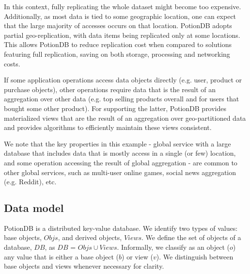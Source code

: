 \documentclass[sigconf, nonacm]{acmart}
\begin{document}
In this context, fully replicating the whole dataset might become too expensive.
Additionally, as most data is tied to some geographic location, one can expect that the large majority of accesses
occurs on that location. 
PotionDB adopts partial geo-replication, with data items being replicated only at some locations.
This allows PotionDB to reduce replication cost when
compared to solutions featuring full replication, saving on both storage, processing and networking costs.

If some application operations access data objects directly (e.g. user, product or purchase objects),
other operations require data that is the result of an aggregation over other data (e.g.  top
selling products overall and for users that bought some other product).  For supporting the latter, %
PotionDB provides materialized views that are the result of an aggregation 
over geo-partitioned data and provides algorithms to efficiently maintain these views consistent.

We note that the key properties in this example - global service with a large database that includes
data that is mostly access in a single (or few) location,  and some operation accessing the result
of global aggregation - are common to other global services, such as multi-user online games,
social news aggregation (e.g.  Reddit), etc.



\subsection{Data model}
\label{subsec:datamodel}

PotionDB is a distributed key-value database.
We identify two types of values: base objects, $\mathit{Objs}$, and derived objects, $\mathit{Views}$.
We define the set of objects of a database, $\mathit{DB}$, as $\mathit{DB}$ = $\mathit{Objs} \cup \mathit{Views}$.
Informally, we classify as an object ($o$) any value that is either a base object ($b$) or view ($v$).
We distinguish between base objects and views whenever necessary for clarity.
\end{document}
